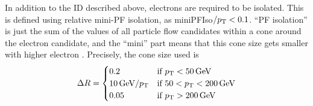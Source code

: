 \begin{table}[htbp]
\caption{Cut-based electron ID for the Veto and Loose ID working points, for electrons in the barrel (endcap).}
\label{tab:electron_id}
\scriptsize
\centering
{}
\end{table}

In addition to the ID described above, electrons are required to be isolated. This is defined using relative
mini-PF isolation, as miniPFIso$/p_{\mathrm{T}}<0.1$. ``PF isolation'' is just the sum of the \pt values of all particle flow candidates
within a cone around the electron candidate, and the ``mini'' part means that this cone size gets smaller
with higher electron \pt. Precisely, the cone size used is
\begin{equation}
\label{eqn:miniiso}
 \Delta R =
  \begin{cases}
   0.2          & \text{if } p_{\mathrm{T}} < 50\,\text{Ge\hspace{-.08em}V} \\
   10\,\text{Ge\hspace{-.08em}V}/p_{\mathrm{T}}   & \text{if } 50 < p_{\mathrm{T}} < 200\,\text{Ge\hspace{-.08em}V} \\
   0.05         & \text{if } p_{\mathrm{T}} > 200\,\text{Ge\hspace{-.08em}V}
  \end{cases}
\end{equation}

